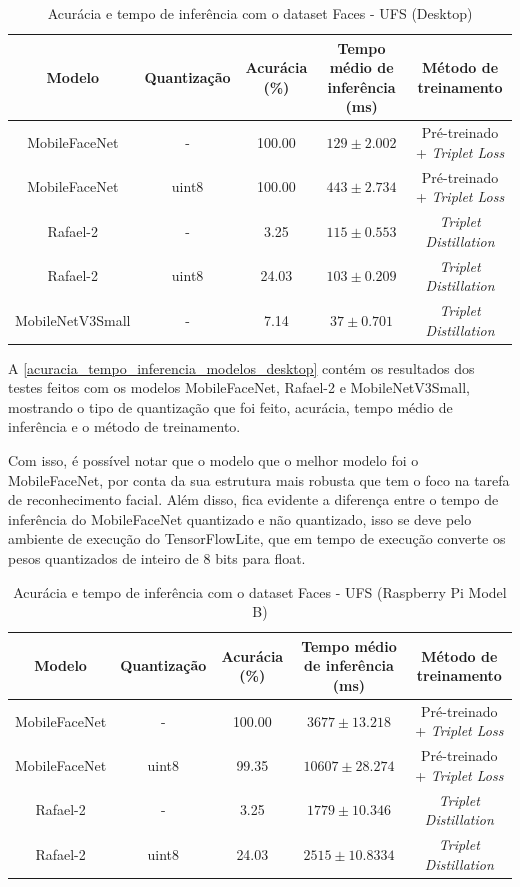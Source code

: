 \begin{table}[htb]
\centering
\ABNTEXfontereduzida
\caption[Acurácia e tempo de inferência com o dataset Faces - UFS (Desktop)]{Acurácia e tempo de inferência com o dataset Faces - UFS (Desktop)}
\label{acuracia_tempo_inferencia_modelos_desktop}
\begin{tabular}{ |c|c|c|c|c| }
	\hline
	\textbf{Modelo} & \textbf{Quantização} & \textbf{Acurácia (\%)} & \textbf{Tempo médio de inferência (ms)} & \textbf{Método de treinamento} \\
	\hline
	MobileFaceNet 	&-	& 	100.00  & $129 \pm 2.002$ & Pré-treinado + \textit{Triplet Loss} \\
	MobileFaceNet 	&uint8	& 	100.00  & $443 \pm 2.734$ & Pré-treinado + \textit{Triplet Loss} \\
	Rafael-2	&-	& 	 3.25 & $115 \pm 0.553$ & \textit{Triplet Distillation} \\
	Rafael-2	&uint8	& 	 24.03& $103 \pm 0.209$ & \textit{Triplet Distillation} \\
	MobileNetV3Small&-	& 	 7.14& $37 \pm 0.701$ & \textit{Triplet Distillation} \\
	\hline
\end{tabular}
\end{table}

A \autoref{acuracia_tempo_inferencia_modelos_desktop} contém os resultados dos testes feitos com os modelos
MobileFaceNet, Rafael-2 e MobileNetV3Small, mostrando o tipo de quantização que foi feito, acurácia, tempo
médio de inferência e o método de treinamento.

Com isso, é possível notar que o modelo que o melhor modelo foi o MobileFaceNet, por conta da sua estrutura
mais robusta que tem o foco na tarefa de reconhecimento facial. Além disso, fica evidente a diferença entre
o tempo de inferência do MobileFaceNet quantizado e não quantizado, isso se deve pelo ambiente de execução
do TensorFlowLite, que em tempo de execução converte os pesos quantizados de inteiro de 8 bits para float.


\begin{table}[htb]
\centering
\ABNTEXfontereduzida
\caption[Acurácia e tempo de inferência com o dataset Faces - UFS (Raspberry Pi Model B)]{Acurácia e tempo de inferência com o dataset Faces - UFS (Raspberry Pi Model B)}
\label{acuracia_tempo_inferencia_modelos_raspberry}
\begin{tabular}{ |c|c|c|c|c| }
	\hline
	\textbf{Modelo} & \textbf{Quantização} & \textbf{Acurácia (\%)} & \textbf{Tempo médio de inferência (ms)} & \textbf{Método de treinamento} \\
	\hline
	MobileFaceNet 	&-	& 	100.00  & $3677 \pm 13.218$ & Pré-treinado + \textit{Triplet Loss} \\
	MobileFaceNet 	&uint8	& 	 99.35  & $10607 \pm 28.274$ & Pré-treinado + \textit{Triplet Loss} \\
	Rafael-2	&-	& 	 3.25 	& $1779 \pm 10.346$ & \textit{Triplet Distillation} \\
	Rafael-2	&uint8	& 	 24.03	& $2515 \pm 10.8334$ & \textit{Triplet Distillation} \\
	\hline
\end{tabular}
\end{table}


